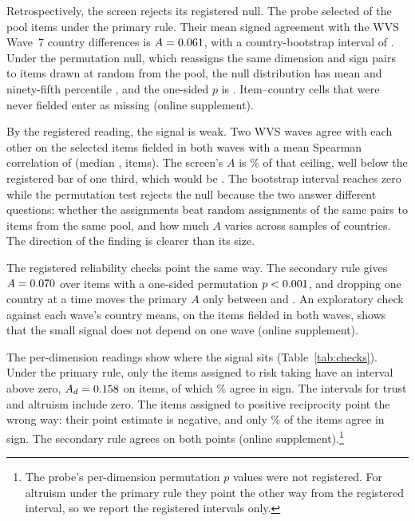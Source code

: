 Retrospectively, the screen rejects its registered null. The probe selected  of the  pool items under the primary rule. Their mean signed agreement with the WVS Wave~7 country differences is $A=\cl{0.061}{SCR_A_primary}$, with a country-bootstrap interval of . Under the permutation null, which reassigns the same dimension and sign pairs to items drawn at random from the pool, the null distribution has mean  and ninety-fifth percentile , and the one-sided $p$ is . Item--country cells that were never fielded enter as missing (online supplement).

By the registered reading, the signal is weak. Two WVS waves agree with each other on the selected items fielded in both waves with a mean Spearman correlation of  (median ,  items). The screen's $A$ is \% of that ceiling, well below the registered bar of one third, which would be . The bootstrap interval reaches zero while the permutation test rejects the null because the two answer different questions: whether the assignments beat random assignments of the same pairs to items from the same pool, and how much $A$ varies across samples of countries. The direction of the finding is clearer than its size.

The registered reliability checks point the same way. The secondary rule gives $A=\cl{0.070}{SCR_secondary_A}$ over  items with a one-sided permutation $p\cl{<0.001}{SCR_secondary_p_perm}$, and dropping one country at a time moves the primary $A$ only between  and . An exploratory check against each wave's country means, on the items fielded in both waves, shows that the small signal does not depend on one wave (online supplement).



The per-dimension readings show where the signal sits (Table~\ref{tab:checks}). Under the primary rule, only the items assigned to risk taking have an interval above zero, $A_d=\cl{0.158}{PD_adapter_primary_risktaking_A}$  on  items, of which \% agree in sign. The intervals for trust and altruism include zero. The items assigned to positive reciprocity point the wrong way: their point estimate is negative, and only \% of the  items agree in sign. The secondary rule agrees on both points (online supplement).\footnote{The probe's per-dimension permutation $p$ values were not registered. For altruism under the primary rule they point the other way from the registered interval, so we report the registered intervals only.}

